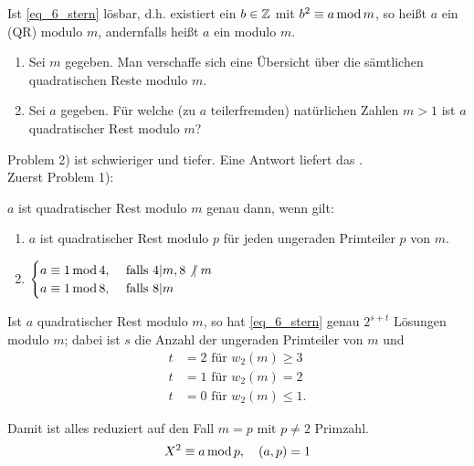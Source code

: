 \begin{defn}
	Ist \eqref{eq_6_stern} lösbar, d.h. existiert ein $b \in \mathbb{Z}$ mit $b^2 \equiv a  \operatorname{mod} m$, so heißt $a$ ein  (QR) modulo $m$, andernfalls heißt $a$ ein  modulo $m$.
\end{defn}

	\begin{enumerate}[1)]
		\item Sei $m$ gegeben. Man verschaffe sich eine Übersicht über die sämtlichen quadratischen Reste modulo $m$.
		\item Sei $a$ gegeben. Für welche (zu $a$ teilerfremden) natürlichen Zahlen $m > 1$ ist $a$ quadratischer Rest modulo $m$?
	\end{enumerate}

Problem 2) ist schwieriger und tiefer. Eine Antwort liefert das .\\ Zuerst Problem 1): 

\begin{falko} \label{F6.2}
	$a$ ist quadratischer Rest modulo $m$ genau dann, wenn gilt:
	\begin{enumerate}[1)]
		\item $a$ ist quadratischer Rest modulo $p$ für jeden ungeraden Primteiler $p$ von $m$.
		\item $\begin{cases}
			a \equiv 1 \operatorname{mod} 4, & \text{ falls } 4 | m, 8 \not| \ m \\
			a \equiv 1 \operatorname{mod} 8, & \text{ falls } 8 | m
		\end{cases}$
	\end{enumerate}
	Ist $a$ quadratischer Rest modulo $m$, so hat \eqref{eq_6_stern} genau $2^{s+t}$ Lösungen modulo $m$; dabei ist $s$ die Anzahl der ungeraden Primteiler von $m$ und
	\begin{equation}
	\begin{aligned}
		t &= 2 \text{ für } w_2(m) \geq 3 \\
		t &= 1 \text{ für } w_2(m) = 2 \\
		t &= 0 \text{ für } w_2(m) \leq 1.
	\end{aligned}
	\end{equation}
\end{falko}

Damit ist alles reduziert auf den Fall $m = p$ mit $p \neq 2$ Primzahl. 
\begin{equation}
	X^2 \equiv a \operatorname{mod} p, \quad (a,p) = 1 \label{eq_legendre}
\end{equation}

